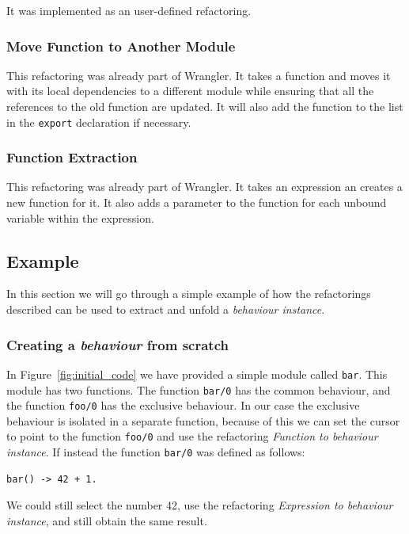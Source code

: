 It was implemented as an user-defined refactoring.


\subsubsection{Move Function to Another Module\label{sub:move_fun}}

This refactoring was already part of Wrangler. It takes a function
and moves it with its local dependencies to a different module while
ensuring that all the references to the old function are updated.
It will also add the function to the list in the \texttt{export} declaration
if necessary.


\subsubsection{Function Extraction\label{sub:fun_extraction}}

This refactoring was already part of Wrangler. It takes an expression
an creates a new function for it. It also adds a parameter to the
function for each unbound variable within the expression.


\subsection{Example}

In this section we will go through a simple example of how the refactorings
described can be used to extract and unfold a \emph{behaviour instance}.


\subsubsection{Creating a \emph{behaviour} from scratch}

In Figure~\ref{fig:initial_code} we have provided a simple module
called \texttt{bar}. This module has two functions. The function \texttt{bar/0}
has the common behaviour, and the function \texttt{foo/0} has the
exclusive behaviour. In our case the exclusive behaviour is isolated
in a separate function, because of this we can set the cursor to point
to the function \texttt{foo/0} and use the refactoring \emph{Function
to behaviour instance}. If instead the function \texttt{bar/0} was
defined as follows:

\begin{verbatim}
bar() -> 42 + 1.
\end{verbatim}

We could still select the number 42, use the refactoring \emph{Expression
to behaviour instance}, and still obtain the same result.

